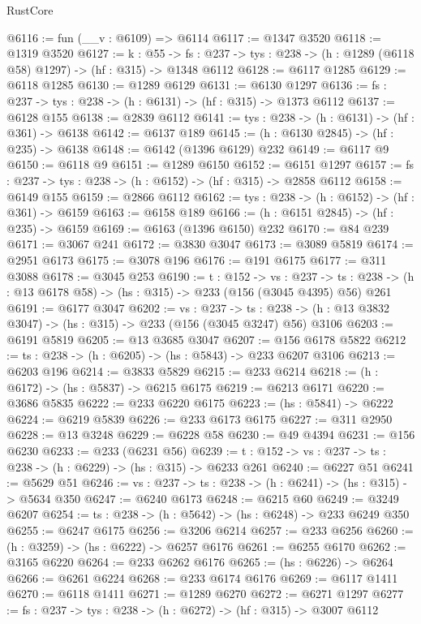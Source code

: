 \begin{lexlean}{RustCore}
\begin{coremodule}
@6116 := fun (__v : @6109) => @6114
@6117 := @1347 @3520
@6118 := @1319 @3520
@6127 := {k : @55} ->
  {fs : @237} -> {tys : @238} -> (h : @1289 (@6118 @58) @1297) -> (hf : @315) -> @1348 @6112
@6128 := @6117 @1285
@6129 := @6118 @1285
@6130 := @1289 @6129
@6131 := @6130 @1297
@6136 := {fs : @237} -> {tys : @238} -> (h : @6131) -> (hf : @315) -> @1373 @6112
@6137 := @6128 @155
@6138 := @2839 @6112
@6141 := {tys : @238} -> (h : @6131) -> (hf : @361) -> @6138
@6142 := @6137 @189
@6145 := (h : @6130 @2845) -> (hf : @235) -> @6138
@6148 := @6142 (@1396 @6129) @232
@6149 := @6117 @9
@6150 := @6118 @9
@6151 := @1289 @6150
@6152 := @6151 @1297
@6157 := {fs : @237} -> {tys : @238} -> (h : @6152) -> (hf : @315) -> @2858 @6112
@6158 := @6149 @155
@6159 := @2866 @6112
@6162 := {tys : @238} -> (h : @6152) -> (hf : @361) -> @6159
@6163 := @6158 @189
@6166 := (h : @6151 @2845) -> (hf : @235) -> @6159
@6169 := @6163 (@1396 @6150) @232
@6170 := @84 @239
@6171 := @3067 @241
@6172 := @3830 @3047
@6173 := @3089 @5819
@6174 := @2951 @6173
@6175 := @3078 @196
@6176 := @191 @6175
@6177 := @311 @3088
@6178 := @3045 @253
@6190 := {t : @152} ->
  {vs : @237} ->
  {ts : @238} -> (h : @13 @6178 @58) -> (hs : @315) -> @233 (@156 (@3045 @4395) @56) @261
@6191 := @6177 @3047
@6202 := {vs : @237} ->
  {ts : @238} -> (h : @13 @3832 @3047) -> (hs : @315) -> @233 (@156 (@3045 @3247) @56) @3106
@6203 := @6191 @5819
@6205 := @13 @3685 @3047
@6207 := @156 @6178 @5822
@6212 := {ts : @238} -> (h : @6205) -> (hs : @5843) -> @233 @6207 @3106
@6213 := @6203 @196
@6214 := @3833 @5829
@6215 := @233 @6214
@6218 := (h : @6172) -> (hs : @5837) -> @6215 @6175
@6219 := @6213 @6171
@6220 := @3686 @5835
@6222 := @233 @6220 @6175
@6223 := (hs : @5841) -> @6222
@6224 := @6219 @5839
@6226 := @233 @6173 @6175
@6227 := @311 @2950
@6228 := @13 @3248
@6229 := @6228 @58
@6230 := @49 @4394
@6231 := @156 @6230
@6233 := @233 (@6231 @56)
@6239 := {t : @152} -> {vs : @237} -> {ts : @238} -> (h : @6229) -> (hs : @315) -> @6233 @261
@6240 := @6227 @51
@6241 := @5629 @51
@6246 := {vs : @237} -> {ts : @238} -> (h : @6241) -> (hs : @315) -> @5634 @350
@6247 := @6240 @6173
@6248 := @6215 @60
@6249 := @3249 @6207
@6254 := {ts : @238} -> (h : @5642) -> (hs : @6248) -> @233 @6249 @350
@6255 := @6247 @6175
@6256 := @3206 @6214
@6257 := @233 @6256
@6260 := (h : @3259) -> (hs : @6222) -> @6257 @6176
@6261 := @6255 @6170
@6262 := @3165 @6220
@6264 := @233 @6262 @6176
@6265 := (hs : @6226) -> @6264
@6266 := @6261 @6224
@6268 := @233 @6174 @6176
@6269 := @6117 @1411
@6270 := @6118 @1411
@6271 := @1289 @6270
@6272 := @6271 @1297
@6277 := {fs : @237} -> {tys : @238} -> (h : @6272) -> (hf : @315) -> @3007 @6112

\end{coremodule}
\end{lexlean}
